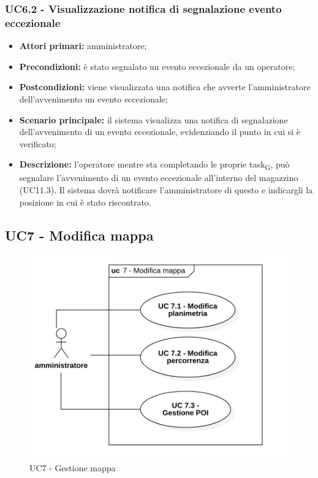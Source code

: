 \subsubsection{UC6.2 - Visualizzazione notifica di segnalazione evento eccezionale}
\begin{itemize}
	\item 	\textbf{Attori primari:} amministratore;
	\item 	\textbf{Precondizioni:} è stato segnalato un evento eccezionale da un operatore;
	\item 	\textbf{Postcondizioni:} viene visualizzata una notifica che avverte l'amministratore dell'avvenimento un evento eccezionale;
	\item 	\textbf{Scenario principale:} il sistema visualizza una notifica di segnalazione dell'avvenimento di un evento eccezionale, evidenziando il punto in cui si è verificato;
	\item 	\textbf{Descrizione:} l'operatore mentre sta completando le proprie task\textsubscript{G}, può segnalare l'avvenimento di un evento eccezionale all'interno del magazzino (UC11.3). Il sistema dovrà notificare l'amministratore di questo e indicargli la posizione in cui è stato riscontrato.
\end{itemize}

\subsection{UC7 - Modifica mappa}



\begin{figure}[H]

   \centering

   \includegraphics[scale=0.52]{res/images/uc7.png}

  \caption{UC7 - Gestione mappa}

\end{figure}



